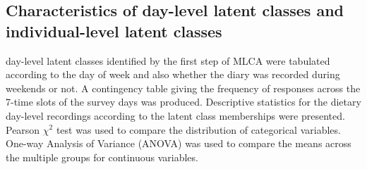 %
%
%



\subsection{Characteristics of day-level latent classes and individual-level latent classes}\vspace{-0.3cm}


day-level latent classes identified by the first step of MLCA were tabulated according to the day of week and also whether the diary was recorded during weekends or not. A contingency table giving the frequency of responses across the 7-time slots of the survey days was produced. Descriptive statistics for the dietary day-level recordings according to the latent class memberships were presented. Pearson $\chi^2$ test was used to compare the distribution of categorical variables. One-way Analysis of Variance (ANOVA) was used to compare the means across the multiple groups for continuous variables.

